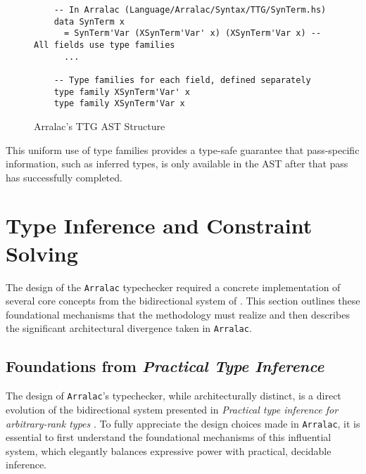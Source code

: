 \begin{figure}
    \centering
    \begin{verbatim}
    -- In Arralac (Language/Arralac/Syntax/TTG/SynTerm.hs)
    data SynTerm x
      = SynTerm'Var (XSynTerm'Var' x) (XSynTerm'Var x) -- All fields use type families
      ...
    
    -- Type families for each field, defined separately
    type family XSynTerm'Var' x
    type family XSynTerm'Var x
    \end{verbatim}
    \caption{Arralac's TTG AST Structure}
\end{figure}

This uniform use of type families provides a type-safe guarantee that pass-specific information, such as inferred types, is only available in the AST after that pass has successfully completed.

\section{Type Inference and Constraint Solving}
\label{sec:Design:TypeInference}

The design of the \texttt{Arralac} typechecker required a concrete implementation of several core concepts from the bidirectional system of \cite{jones-practical-2007}. This section outlines these foundational mechanisms that the methodology must realize and then describes the significant architectural divergence taken in \texttt{Arralac}.

\subsection{Foundations from \textit{Practical Type Inference}}
\label{sec:Design:Foundations}

The design of \texttt{Arralac}'s typechecker, while architecturally distinct, is a direct evolution of the bidirectional system presented in \textit{Practical type inference for arbitrary-rank types} \cite{jones-practical-2007}. To fully appreciate the design choices made in \texttt{Arralac}, it is essential to first understand the foundational mechanisms of this influential system, which elegantly balances expressive power with practical, decidable inference.

